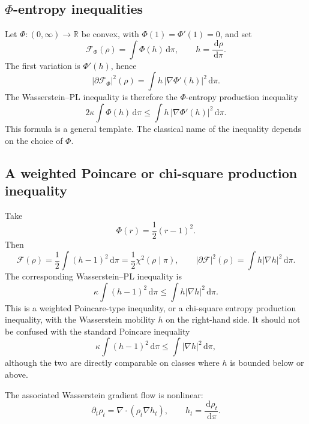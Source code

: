 \documentclass[11pt]{article}
\theoremstyle{definition}
\newcommand{\F}{\mathcal F}
\newcommand{\R}{\mathbb R}
\newcommand{\dd}{\,\mathrm d}
\begin{document}
\subsection{\texorpdfstring{$\Phi$}{Phi}-entropy inequalities}

Let $\Phi:(0,\infty)\to\R$ be convex, with $\Phi(1)=\Phi'(1)=0$, and set
\begin{equation}
        \F_\Phi(\rho)=\int \Phi(h)\dd\pi,
        \qquad h=\frac{\dd\rho}{\dd\pi}.
        \label{eq:phi-entropy}
\end{equation}
The first variation is $\Phi'(h)$, hence
\begin{equation}
        |\partial \F_\Phi|^2(\rho)
        =\int h\,|\nabla\Phi'(h)|^2\dd\pi.
        \label{eq:phi-slope}
\end{equation}
The Wasserstein--PL inequality is therefore the $\Phi$-entropy production inequality
\begin{equation}
        2\kappa\int\Phi(h)\dd\pi
        \le
        \int h\,|\nabla\Phi'(h)|^2\dd\pi.
        \label{eq:phi-pl}
\end{equation}
This formula is a general template. The classical name of the inequality depends on the choice of $\Phi$.

\subsection{A weighted Poincare or chi-square production inequality}

Take
\[
        \Phi(r)=\frac12(r-1)^2.
\]
Then
\[
        \F(\rho)=\frac12\int (h-1)^2\dd\pi
        =\frac12\chi^2(\rho\mid\pi),
        \qquad
        |\partial\F|^2(\rho)=\int h|\nabla h|^2\dd\pi.
\]
The corresponding Wasserstein--PL inequality is
\begin{equation}
        \kappa\int (h-1)^2\dd\pi
        \le \int h|\nabla h|^2\dd\pi.
        \label{eq:weighted-poincare-pl}
\end{equation}
This is a weighted Poincare-type inequality, or a chi-square entropy production inequality, with the Wasserstein mobility $h$ on the right-hand side. It should not be confused with the standard Poincare inequality
\[
        \kappa\int (h-1)^2\dd\pi\le \int |\nabla h|^2\dd\pi,
\]
although the two are directly comparable on classes where $h$ is bounded below or above.

The associated Wasserstein gradient flow is nonlinear:
\begin{equation}
        \partial_t\rho_t=\nabla\cdot(\rho_t\nabla h_t),
        \qquad h_t=\frac{\dd\rho_t}{\dd\pi}.
        \label{eq:chi-square-flow}
\end{equation}
\end{document}
